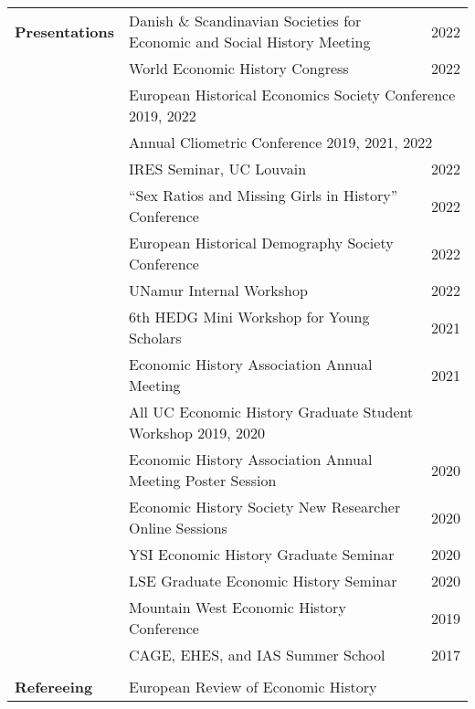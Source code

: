 \documentclass[letterpaper,11pt,oneside]{article}
\begin{document}
\begin{longtable}{@{} p{0.15\linewidth} p{0.8\linewidth} p{0.05\linewidth}}
 \textbf{\large{Presentations}}    & Danish  \& Scandinavian Societies for Economic and Social History Meeting &  \hfill 2022  \\
 & World Economic History Congress & \hfill 2022 \\
 & \multicolumn{2}{l}{  European Historical Economics Society Conference   \hfill 2019, 2022} \\
 & \multicolumn{2}{l}{ Annual Cliometric Conference    \hfill 2019, 2021, 2022} \\
 & IRES Seminar, UC Louvain & \hfill 2022 \\
 &  ``Sex Ratios and Missing Girls in History'' Conference & \hfill 2022\\
 & European Historical Demography Society Conference & \hfill 2022 \\
 & UNamur Internal Workshop & \hfill 2022 \\
 &   6th HEDG Mini Workshop for Young Scholars   & \hfill 2021\\
 &   Economic History Association Annual Meeting   & \hfill 2021\\
 & \multicolumn{2}{l}{ All UC Economic History Graduate Student Workshop  \hfill 2019, 2020}\\

   &  Economic History Association Annual Meeting Poster Session & \hfill  2020\\
   &  Economic History Society New Researcher Online Sessions & \hfill 2020\\
  &  YSI Economic History Graduate Seminar & \hfill 2020\\
   &  LSE Graduate Economic History Seminar & \hfill  2020\\
     &  Mountain West Economic History Conference  & \hfill  2019\\
     &  CAGE, EHES, and IAS Summer School  & \hfill  2017\\
     \\
     \textbf{\large{Refereeing}}   &   European Review of Economic History &\\

   
    \end{longtable}
\end{document}
